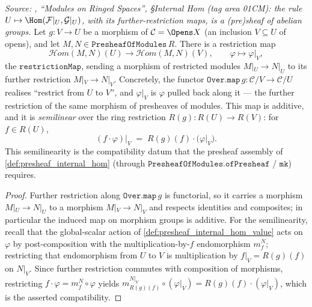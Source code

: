 \begin{lemma}\leanok
  \label{lem:presheaf_internal_hom_restriction}
  \textit{Source: \cite{stacks-project}, ``Modules on Ringed Spaces'', \S Internal Hom
  (tag area 01CM): the rule \(U \mapsto \Hom(\mathcal{F}|_U, \mathcal{G}|_U)\), with its
  further-restriction maps, is a (pre)sheaf of abelian groups.}
  Let \(g : V \to U\) be a morphism of \(\mathcal{C} = \Opens X\) (an inclusion
  \(V \subseteq U\) of opens), and let \(M, N \in \mathtt{PresheafOfModules}\,R\). There
  is a restriction map
  \[
    \mathcal{H}om(M, N)(U) \longrightarrow \mathcal{H}om(M, N)(V),
    \qquad \varphi \longmapsto \varphi|_V,
  \]
  the \(\mathtt{restrictionMap}\), sending a morphism of restricted modules
  \(M|_U \to N|_U\) to its further restriction \(M|_V \to N|_V\). Concretely, the
  functor \(\mathtt{Over.map}\,g : \mathcal{C}/V \to \mathcal{C}/U\) realises
  ``restrict from \(U\) to \(V\)'', and \(\varphi|_V\) is \(\varphi\) pulled back along
  it --- the further restriction of the same morphism of presheaves of modules. This
  map is additive, and it is \emph{semilinear} over the ring restriction
  \(R(g) : R(U) \to R(V)\): for \(f \in R(U)\),
  \[
    (f \cdot \varphi)\big|_V \;=\; R(g)(f) \cdot \bigl(\varphi|_V\bigr).
  \]
  This semilinearity is the compatibility datum that the presheaf assembly of
  \cref{def:presheaf_internal_hom} (through \(\mathtt{PresheafOfModules.ofPresheaf}\) /
  \(\mathtt{mk}\)) requires.
\end{lemma}

\begin{proof}
  \leanok
  Further restriction along \(\mathtt{Over.map}\,g\) is functorial, so it carries a
  morphism \(M|_U \to N|_U\) to a morphism \(M|_V \to N|_V\) and respects identities and
  composites; in particular the induced map on morphism groups is additive. For the
  semilinearity, recall that the global-scalar action of
  \cref{def:presheaf_internal_hom_value} acts on \(\varphi\) by post-composition with
  the multiplication-by-\(f\) endomorphism \(m_f^{N}\); restricting that endomorphism
  from \(U\) to \(V\) is multiplication by \(f|_V = R(g)(f)\) on \(N|_V\). Since further
  restriction commutes with composition of morphisms, restricting \(f \cdot \varphi =
  m_f^{N} \circ \varphi\) yields \(m_{R(g)(f)}^{N|_V} \circ (\varphi|_V) = R(g)(f) \cdot
  (\varphi|_V)\), which is the asserted compatibility.
\end{proof}

